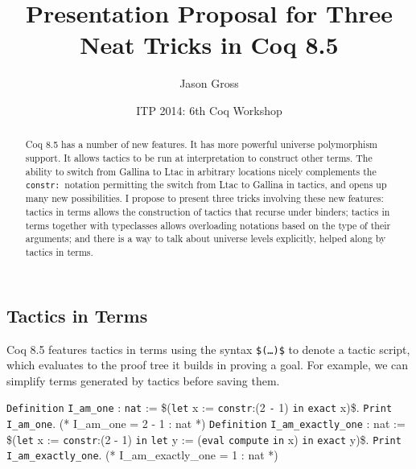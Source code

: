 \documentclass{article}
\title{Presentation Proposal for Three Neat Tricks in Coq 8.5}
\author{Jason Gross}
\date{ITP 2014: 6th Coq Workshop}
\makeatletter
\gdef\@makeopenbrace<\catcode`{>
\gdef\@makeclosebrace<\catcode`}>
\newcommand{\processcommands}[1]{{%
  \catcode`\\=0\relax
  \@makeopenbrace=1\relax
  \@makeclosebrace=2\relax
  \def\{{\texttt{\mytextbraceleft}}
  \def\}{\texttt{\mytextbraceright}}
  \scantokens{#1}%
}}
\newcommand{\processcommandsinverbatimline}{\expandafter\processcommands\expandafter{\the\verbatim@line}}
\newenvironment{coqcode}{\begingroup
  \vspace{0.5\baselineskip}
  \let\trivlist\relax
  \let\endtrivlist\relax
  \let\item\relax
  \setlength{\parsep}{0pt}%
  \setlength{\parskip}{0pt}%
  \setlength{\topsep}{0pt}%
  \setlength{\@topsepadd}{0pt}%
  \setlength{\partopsep}{0pt}%
  \setlength{\@topsep}{0pt}%
  \let\old@@par\@@par
  \let\@@par\relax
  \let\old@vskip\vskip
  \let\vskip\relax
  \verbatim
  \let\@@par\old@@par
  \let\vskip\old@vskip
  \let\verbatim@processline=\processcommandsinverbatimline
}{\endverbatim\endgroup\vspace{0.5\baselineskip}}
\newcommand{\coqdockw}[1]{\texttt {\textcolor{kwred}{#1}}}
\newcommand{\coqdocvar}[1]{\textcolor{varpurple}{#1}}
\newcommand{\coqdoccst}[1]{\texttt{\textcolor{defgreen}{#1}}}%
\newcommand{\coqdocind}[1]{\texttt{\textcolor{indblue}{#1}}}%
\newcommand{\coqdoctac}[1]{\texttt{#1}}
\newcommand{\coqdocinductive}[1]{\coqdocind{#1}}
\newcommand{\coqdocdefinition}[1]{\coqdoccst{#1}}
\newcommand{\coqdocnotation}[1]{\coqdockw{#1}}
\makeatother
\begin{document}
\begin{abstract}
Coq 8.5 has a number of new features.  It has more powerful universe polymorphism support.  It allows tactics to be run at interpretation to construct other terms.  The ability to switch from Gallina to Ltac in arbitrary locations nicely complements the \texttt{constr:}~notation permitting the switch from Ltac to Gallina in tactics, and opens up many new possibilities.  I propose to present three tricks involving these new features: tactics in terms allows the construction of tactics that recurse under binders; tactics in terms together with typeclasses allows overloading notations based on the type of their arguments; and there is a way to talk about universe levels explicitly, helped along by tactics in terms.
\end{abstract}
\subsection{Tactics in Terms}
Coq 8.5 features tactics in terms using the syntax \texttt{\$(\ldots)\$} to denote a tactic script, which evaluates to the proof tree it builds in proving a goal.  For example, we can simplify terms generated by tactics before saving them.
\begin{coqcode}
\coqdockw{Definition} \coqdocdefinition{I_am_one} : \coqdocinductive{nat} := \$(\coqdockw{let} \coqdocvar{x} := \coqdockw{constr}:(2 \coqdocnotation{-} 1) \coqdoctac{in} \coqdoctac{exact} \coqdocvar{x})\$.
\coqdockw{Print} \coqdocdefinition{I_am_one}.
(* I_am_one = 2 - 1 : nat *)
\coqdockw{Definition} \coqdocdefinition{I_am_exactly_one} : \coqdocvar{nat} := \$(\coqdockw{let} \coqdocvar{x} := \coqdockw{constr}:(2 - 1) \coqdoctac{in}
                                       \coqdockw{let} \coqdocvar{y} := (\coqdoctac{eval} \coqdoctac{compute} \coqdoctac{in} \coqdocvar{x}) \coqdoctac{in}
                                       \coqdoctac{exact} \coqdocvar{y})\$.
\coqdockw{Print} \coqdocdefinition{I_am_exactly_one}.
(* I_am_exactly_one = 1 : nat *)
\end{coqcode}
\end{document}
